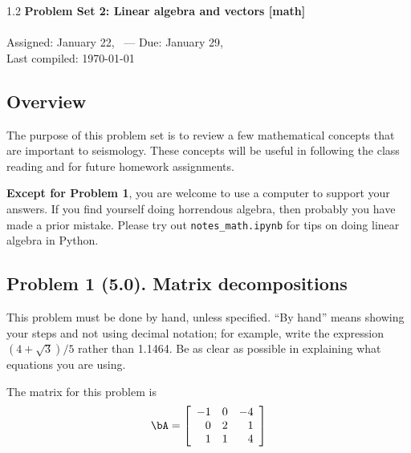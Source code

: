 \documentclass[11pt,titlepage,fleqn]{article}
\begin{document}

\begin{spacing}{1.2}
\centering
{\large \bf Problem Set 2: Linear algebra and vectors [math]} \\
\cltag\ \\
Assigned: January 22, \cyear\ --- Due: January 29, \cyear\ \\
Last compiled: \today \\
\end{spacing}


\subsection*{Overview}

The purpose of this problem set is to review a few mathematical concepts that are important to seismology. These concepts will be useful in following the class reading \citep{SteinWysession,ShearerE2} and for future homework assignments.

{\bf Except for Problem 1}, you are welcome to use a computer to support your answers. If you find yourself doing horrendous algebra, then probably you have made a prior mistake. Please try out \verb+notes_math.ipynb+ for tips on doing linear algebra in Python.


\subsection*{Problem 1 (5.0). Matrix decompositions}

This problem must be done by hand, unless specified. ``By hand'' means showing your steps and not using decimal notation; for example, write the expression $(4 +\sqrt{3})/5$ rather than 1.1464.
Be as clear as possible in explaining what equations you are using.

\medskip\noindent
The matrix for this problem is
%
\begin{equation*}
\bA =  \left[ \begin{array}{rrr}
    -1  &   0  &  -4 \\
     0  &   2  &   1 \\
     1  &   1  &   4 \\
\end{array} \right]
\end{equation*}
\end{document}
